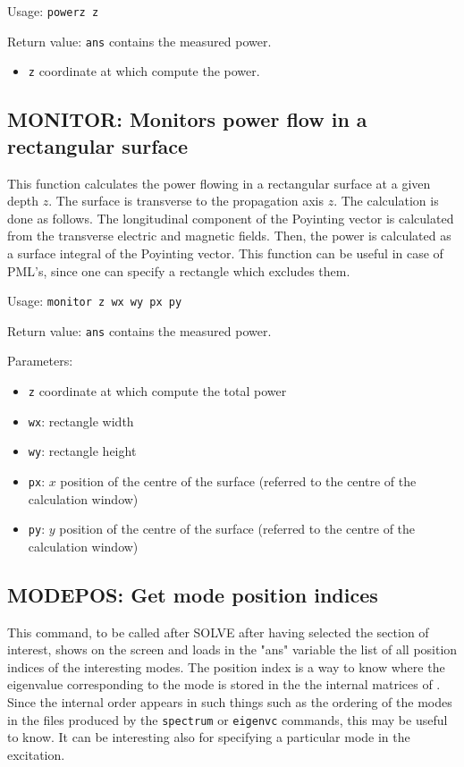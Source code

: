 Usage:  \lstinline!powerz z!

Return value: \lstinline!ans! contains the measured power.  

\begin{itemize}
\item \lstinline!z! coordinate at which compute the power.
\end{itemize}


\subsection{MONITOR: Monitors power flow in a rectangular surface}
\label{subsec_monitor}
This function calculates the power flowing in a rectangular surface at a given depth $z$. The surface is transverse to the propagation axis $z$. 
The calculation is done as follows. The longitudinal component of the Poyinting vector is calculated from the transverse electric and magnetic fields. Then, the power is calculated as a surface integral of the Poyinting vector.
This function can be useful in case of PML's, since one can specify a rectangle which excludes them.
 
Usage:  \lstinline!monitor z wx wy px py!  

Return value: \lstinline!ans! contains the measured power.  
 
Parameters: 
\begin{itemize}
\item \lstinline!z! coordinate at which compute the total power 
\item \lstinline!wx!: rectangle width 
\item \lstinline!wy!: rectangle height 
\item \lstinline!px!: $x$ position of the centre of the surface (referred to the centre of the calculation window) 
\item \lstinline!py!: $y$ position of the centre of the surface (referred to the centre of the calculation window)
\end{itemize}

\subsection{MODEPOS: Get mode position indices}
This command, to be called after SOLVE after having selected the section of interest, shows on the screen and loads in the "ans" variable the list of all position indices of the interesting modes.
The position index is a way to know where the eigenvalue corresponding to the  mode is stored in the the internal matrices of \afmm . Since the internal order appears in such things such as the ordering of the modes in the files produced by the \lstinline!spectrum! or \lstinline!eigenvc! commands, this may be useful to know. It can be interesting also for specifying a particular mode in the excitation.
    
